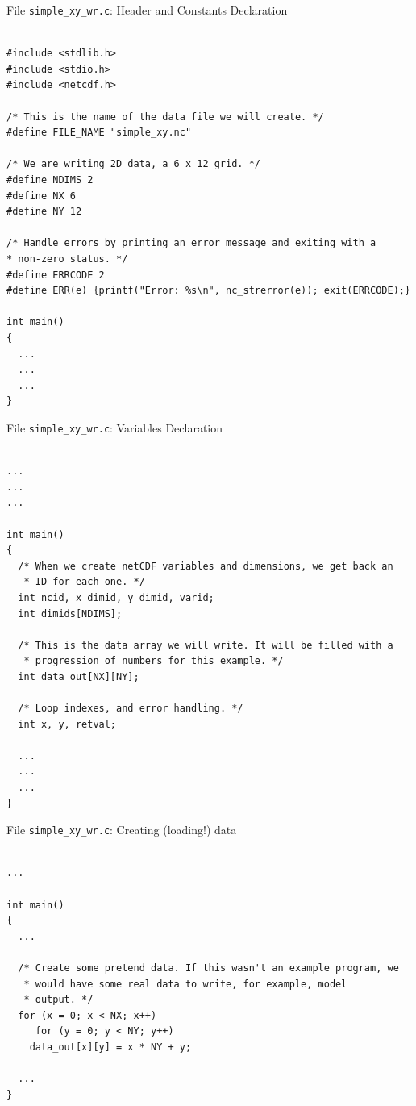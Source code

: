\documentclass[compress,11pt,xcolor=svgnames,aspectratio=169]{beamer}
\begin{document}
\begin{frame}[fragile]{File \texttt{simple\_xy\_wr.c}: Header and Constants Declaration}

{\tiny

\begin{verbatim}

#include <stdlib.h>
#include <stdio.h>
#include <netcdf.h>

/* This is the name of the data file we will create. */
#define FILE_NAME "simple_xy.nc"

/* We are writing 2D data, a 6 x 12 grid. */
#define NDIMS 2
#define NX 6
#define NY 12

/* Handle errors by printing an error message and exiting with a
* non-zero status. */
#define ERRCODE 2
#define ERR(e) {printf("Error: %s\n", nc_strerror(e)); exit(ERRCODE);}

int main()
{
  ...
  ...
  ...
}

\end{verbatim}

}

\end{frame}

\begin{frame}[fragile]{File \texttt{simple\_xy\_wr.c}: Variables Declaration}

{\tiny

\begin{verbatim}

...
...
...

int main()
{
  /* When we create netCDF variables and dimensions, we get back an
   * ID for each one. */
  int ncid, x_dimid, y_dimid, varid;
  int dimids[NDIMS];

  /* This is the data array we will write. It will be filled with a
   * progression of numbers for this example. */
  int data_out[NX][NY];

  /* Loop indexes, and error handling. */
  int x, y, retval;

  ...
  ...
  ...
}

\end{verbatim}

}

\end{frame}

\begin{frame}[fragile]{File \texttt{simple\_xy\_wr.c}: Creating (loading!) data}

{\tiny

\begin{verbatim}

...

int main()
{
  ...

  /* Create some pretend data. If this wasn't an example program, we
   * would have some real data to write, for example, model
   * output. */
  for (x = 0; x < NX; x++)
     for (y = 0; y < NY; y++)
    data_out[x][y] = x * NY + y;

  ...
}

\end{verbatim}

}

\end{frame}
\end{document}
